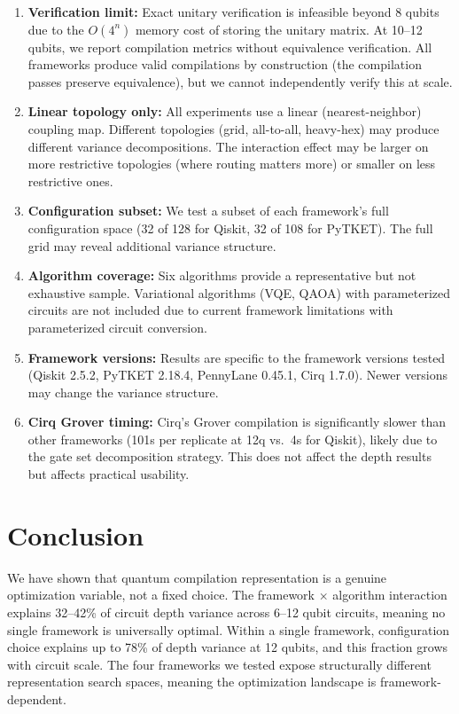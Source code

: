 \documentclass[11pt,a4paper]{article}
\begin{document}
\begin{enumerate}[noitemsep]
\item \textbf{Verification limit:} Exact unitary verification is infeasible beyond 8 qubits due to the $O(4^n)$ memory cost of storing the unitary matrix. At 10--12 qubits, we report compilation metrics without equivalence verification. All frameworks produce valid compilations by construction (the compilation passes preserve equivalence), but we cannot independently verify this at scale.
\item \textbf{Linear topology only:} All experiments use a linear (nearest-neighbor) coupling map. Different topologies (grid, all-to-all, heavy-hex) may produce different variance decompositions. The interaction effect may be larger on more restrictive topologies (where routing matters more) or smaller on less restrictive ones.
\item \textbf{Configuration subset:} We test a subset of each framework's full configuration space (32 of 128 for Qiskit, 32 of 108 for PyTKET). The full grid may reveal additional variance structure.
\item \textbf{Algorithm coverage:} Six algorithms provide a representative but not exhaustive sample. Variational algorithms (VQE, QAOA) with parameterized circuits are not included due to current framework limitations with parameterized circuit conversion.
\item \textbf{Framework versions:} Results are specific to the framework versions tested (Qiskit 2.5.2, PyTKET 2.18.4, PennyLane 0.45.1, Cirq 1.7.0). Newer versions may change the variance structure.
\item \textbf{Cirq Grover timing:} Cirq's Grover compilation is significantly slower than other frameworks (101s per replicate at 12q vs.\ 4s for Qiskit), likely due to the gate set decomposition strategy. This does not affect the depth results but affects practical usability.
\end{enumerate}


\section{Conclusion}

We have shown that quantum compilation representation is a genuine optimization variable, not a fixed choice. The framework $\times$ algorithm interaction explains 32--42\% of circuit depth variance across 6--12 qubit circuits, meaning no single framework is universally optimal. Within a single framework, configuration choice explains up to 78\% of depth variance at 12 qubits, and this fraction grows with circuit scale. The four frameworks we tested expose structurally different representation search spaces, meaning the optimization landscape is framework-dependent.
\end{document}
